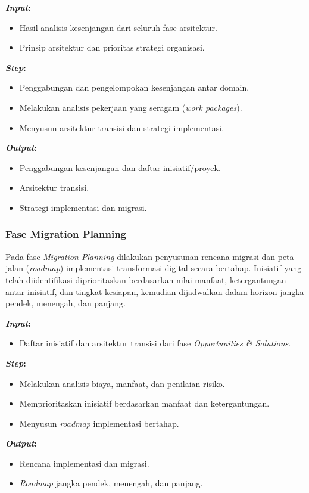 \textbf{\textit{Input}:}
\begin{itemize}
  \item Hasil analisis kesenjangan dari seluruh fase arsitektur.
  \item Prinsip arsitektur dan prioritas strategi organisasi.
\end{itemize}
\textbf{\textit{Step}:}
\begin{itemize}
  \item Penggabungan dan pengelompokan kesenjangan antar domain.
  \item Melakukan analisis pekerjaan yang seragam (\textit{work packages}).
  \item Menyusun arsitektur transisi dan strategi implementasi.
\end{itemize}
\textbf{\textit{Output}:}
\begin{itemize}
  \item Penggabungan kesenjangan dan daftar inisiatif/proyek.
  \item Arsitektur transisi.
  \item Strategi implementasi dan migrasi.
\end{itemize}

\subsubsection{Fase Migration Planning}
Pada fase \textit{Migration Planning} dilakukan penyusunan rencana migrasi dan peta jalan (\textit{roadmap}) implementasi transformasi digital secara bertahap.
Inisiatif yang telah diidentifikasi diprioritaskan berdasarkan nilai manfaat, ketergantungan antar inisiatif, dan tingkat kesiapan, kemudian dijadwalkan dalam horizon jangka pendek, menengah, dan panjang.

\textbf{\textit{Input}:}
\begin{itemize}
  \item Daftar inisiatif dan arsitektur transisi dari fase \textit{Opportunities \& Solutions}.
\end{itemize}
\textbf{\textit{Step}:}
\begin{itemize}
  \item Melakukan analisis biaya, manfaat, dan penilaian risiko.
  \item Memprioritaskan inisiatif berdasarkan manfaat dan ketergantungan.
  \item Menyusun \textit{roadmap} implementasi bertahap.
\end{itemize}
\textbf{\textit{Output}:}
\begin{itemize}
  \item Rencana implementasi dan migrasi.
  \item \textit{Roadmap} jangka pendek, menengah, dan panjang.
\end{itemize}

